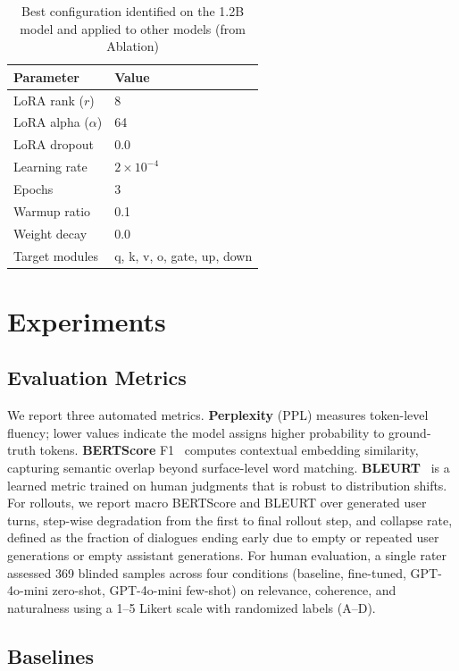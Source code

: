 \documentclass[conference]{IEEEtran}
\begin{document}
\begin{table}[ht]
\centering
\caption{Best configuration identified on the 1.2B model and applied to other models (from Ablation)}
\label{tab:lora-config}
\begin{tabular}{ll}
\toprule
\textbf{Parameter} & \textbf{Value} \\
\midrule
LoRA rank ($r$) & 8 \\
LoRA alpha ($\alpha$) & 64 \\
LoRA dropout & 0.0 \\
Learning rate & $2 \times 10^{-4}$ \\
Epochs & 3 \\
Warmup ratio & 0.1 \\
Weight decay & 0.0 \\
Target modules & q, k, v, o, gate, up, down \\
\bottomrule
\end{tabular}
\end{table}

\section{Experiments}

\subsection{Evaluation Metrics}

We report three automated metrics. \textbf{Perplexity} (PPL) measures token-level fluency; lower values indicate the model assigns higher probability to ground-truth tokens. \textbf{BERTScore} F1~\cite{zhang2020bertscore} computes contextual embedding similarity, capturing semantic overlap beyond surface-level word matching. \textbf{BLEURT}~\cite{sellam2020bleurt} is a learned metric trained on human judgments that is robust to distribution shifts. For rollouts, we report macro BERTScore and BLEURT over generated user turns, step-wise degradation from the first to final rollout step, and collapse rate, defined as the fraction of dialogues ending early due to empty or repeated user generations or empty assistant generations. For human evaluation, a single rater assessed 369 blinded samples across four conditions (baseline, fine-tuned, GPT-4o-mini zero-shot, GPT-4o-mini few-shot) on relevance, coherence, and naturalness using a 1--5 Likert scale with randomized labels (A--D).

\subsection{Baselines}
\end{document}
